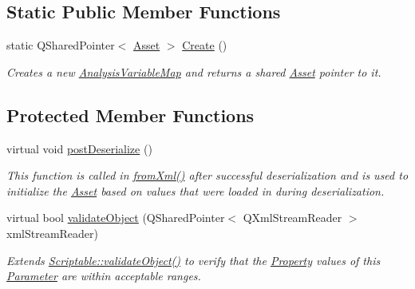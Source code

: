 \subsection*{Static Public Member Functions}
\begin{DoxyCompactItemize}
\item 
\hypertarget{class_picto_1_1_analysis_variable_map_a9a0baf3339df697e923ffcf302c2132b}{static Q\-Shared\-Pointer$<$ \hyperlink{class_picto_1_1_asset}{Asset} $>$ \hyperlink{class_picto_1_1_analysis_variable_map_a9a0baf3339df697e923ffcf302c2132b}{Create} ()}\label{class_picto_1_1_analysis_variable_map_a9a0baf3339df697e923ffcf302c2132b}

\begin{DoxyCompactList}\small\item\em Creates a new \hyperlink{class_picto_1_1_analysis_variable_map}{Analysis\-Variable\-Map} and returns a shared \hyperlink{class_picto_1_1_asset}{Asset} pointer to it. \end{DoxyCompactList}\end{DoxyCompactItemize}
\subsection*{Protected Member Functions}
\begin{DoxyCompactItemize}
\item 
virtual void \hyperlink{class_picto_1_1_analysis_variable_map_abfb12a9e91fb6c3f0dc1baed7305e789}{post\-Deserialize} ()
\begin{DoxyCompactList}\small\item\em This function is called in \hyperlink{class_picto_1_1_asset_a8bed4da09ecb1c07ce0dab313a9aba67}{from\-Xml()} after successful deserialization and is used to initialize the \hyperlink{class_picto_1_1_asset}{Asset} based on values that were loaded in during deserialization. \end{DoxyCompactList}\item 
virtual bool \hyperlink{class_picto_1_1_analysis_variable_map_aa3e515949e9225ac6655095b981bb910}{validate\-Object} (Q\-Shared\-Pointer$<$ Q\-Xml\-Stream\-Reader $>$ xml\-Stream\-Reader)
\begin{DoxyCompactList}\small\item\em Extends \hyperlink{class_picto_1_1_scriptable_ab6e2944c43a3b5d418bf7b251594386d}{Scriptable\-::validate\-Object()} to verify that the \hyperlink{class_picto_1_1_property}{Property} values of this \hyperlink{class_picto_1_1_parameter}{Parameter} are within acceptable ranges. \end{DoxyCompactList}\end{DoxyCompactItemize}
